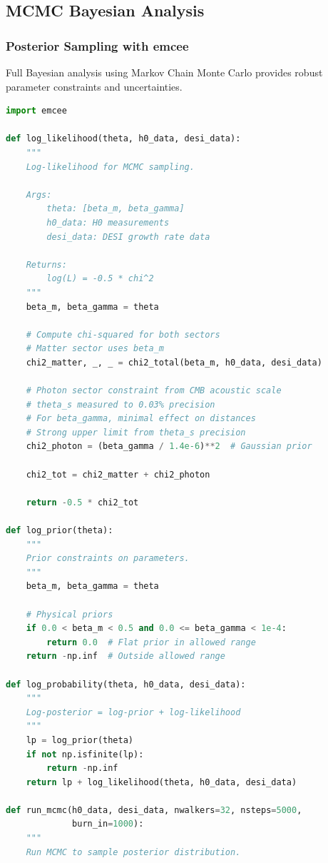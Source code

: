 \documentclass[11pt]{article}
\begin{document}
\subsection{MCMC Bayesian Analysis}

\subsubsection{Posterior Sampling with emcee}

Full Bayesian analysis using Markov Chain Monte Carlo provides robust parameter constraints and uncertainties.

\begin{lstlisting}[language=Python]
import emcee

def log_likelihood(theta, h0_data, desi_data):
    """
    Log-likelihood for MCMC sampling.
    
    Args:
        theta: [beta_m, beta_gamma]
        h0_data: H0 measurements
        desi_data: DESI growth rate data
    
    Returns:
        log(L) = -0.5 * chi^2
    """
    beta_m, beta_gamma = theta
    
    # Compute chi-squared for both sectors
    # Matter sector uses beta_m
    chi2_matter, _, _ = chi2_total(beta_m, h0_data, desi_data)
    
    # Photon sector constraint from CMB acoustic scale
    # theta_s measured to 0.03% precision
    # For beta_gamma, minimal effect on distances
    # Strong upper limit from theta_s precision
    chi2_photon = (beta_gamma / 1.4e-6)**2  # Gaussian prior
    
    chi2_tot = chi2_matter + chi2_photon
    
    return -0.5 * chi2_tot

def log_prior(theta):
    """
    Prior constraints on parameters.
    """
    beta_m, beta_gamma = theta
    
    # Physical priors
    if 0.0 < beta_m < 0.5 and 0.0 <= beta_gamma < 1e-4:
        return 0.0  # Flat prior in allowed range
    return -np.inf  # Outside allowed range

def log_probability(theta, h0_data, desi_data):
    """
    Log-posterior = log-prior + log-likelihood
    """
    lp = log_prior(theta)
    if not np.isfinite(lp):
        return -np.inf
    return lp + log_likelihood(theta, h0_data, desi_data)

def run_mcmc(h0_data, desi_data, nwalkers=32, nsteps=5000, 
             burn_in=1000):
    """
    Run MCMC to sample posterior distribution.
    

\end{lstlisting}
\end{document}
